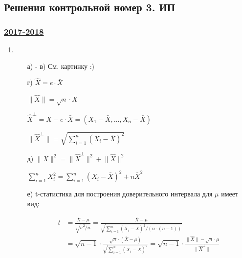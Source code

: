 \subsection*{Решения контрольной номер 3. ИП}

\subsubsection*{\hyperref[sec:kr_03_ip_2017_2018]{2017-2018}}
\label{sec:sol_kr_03_ip_2017_2018}



\begin{enumerate}
\item
\begin{enumerate}
	\item[а) - в)] См. картинку :)
\begin{figure}[h!]
\centering
{}
\end{figure}
\item[г)] $\hat{X}=e\cdot\bar{X}$

$\lVert \hat{X} \rVert=\sqrt{n}\cdot\bar{X}$

$\hat{X}^{\perp}=X-e\cdot\bar{X}=(X_1-\bar{X}, \dots ,X_n-\bar{X})$

$\lVert\hat{X}^{\perp} \rVert =\sqrt{\sum^n_{i=1}(X_i-\bar{X})^2}$

\item[д)] $ \lVert X \rVert^2=\lVert\hat{X}^{\perp}\rVert^2+\lVert\hat{X}\rVert^2$

$\sum^n_{i=1}X^2_i=\sum^n_{i=1}(X_i-\bar{X})^2+n\bar{X}^2$

\item[е)] t-статистика для построения доверительного интервала для $\mu$ имеет вид:

\begin{align*}
t &= \frac{\bar{X}-\mu}{\sqrt{\bar{\sigma}^2/n}} = \frac{\bar{X}-\mu}{\sqrt{\sum^n_{i=1}(X_i-\bar{X})^2/(n\cdot(n-1))}}\\
& =\sqrt{n-1}\cdot\frac{\sqrt{n}\cdot(\bar{X}-\mu)}{\sqrt{\sum^n_{i=1}(X_i-\bar{X})^2}}=\sqrt{n-1}\cdot\frac{\lVert \hat{X} \rVert-\sqrt{n}\cdot\mu}{\lVert\hat{X}^{\perp} \rVert}
\end{align*}


\end{enumerate}
\end{enumerate}
